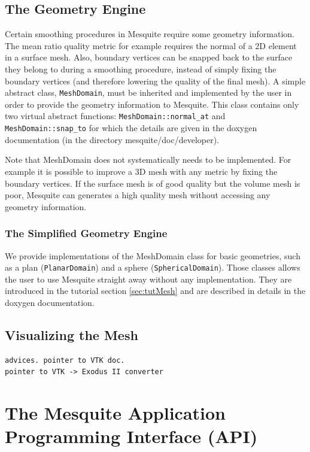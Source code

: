 \documentclass[letter]{report}
\begin{document}
\section{The Geometry Engine}
\label{sec:geometry}

Certain smoothing procedures in Mesquite require some geometry information. The mean ratio quality
metric for example requires the normal of a 2D element in a surface mesh. Also, boundary
vertices can be snapped back to the surface they belong to during a smoothing procedure, instead of
simply fixing the boundary vertices (and therefore lowering the quality of the final mesh). A simple abstract
class, \texttt{MeshDomain}, must be inherited and implemented by the user in order to provide the
geometry information to Mesquite.  This class contains only two virtual abstract functions:
\texttt{MeshDomain::normal\_at} and \texttt{MeshDomain::snap\_to} for which the details are given in
the doxygen documentation (in the directory mesquite/doc/developer).

Note that MeshDomain does not systematically needs to be implemented. For example it is possible to
improve a 3D mesh with any metric by fixing the boundary vertices. If the surface mesh is of good
quality but the volume mesh is poor, Mesquite can generates a high quality mesh without accessing
any geometry information. 


\subsection{The Simplified Geometry Engine}

We provide implementations of the MeshDomain class for basic geometries, such as a plan
(\texttt{PlanarDomain}) and a sphere (\texttt{SphericalDomain}). Those classes allows the user to use
Mesquite straight away without any implementation. They are introduced in the tutorial section
\ref{sec:tutMesh} and are described in details in the doxygen documentation.

\section{Visualizing the Mesh}

\begin{verbatim}
advices. pointer to VTK doc. 
pointer to VTK -> Exodus II converter
\end{verbatim}


\chapter{The Mesquite Application Programming Interface (API)} \label{sec:API}
\end{document}
